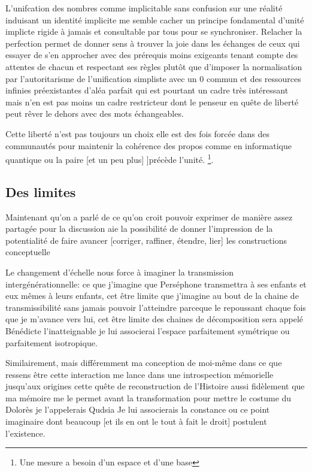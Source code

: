 \documentclass{article}
\begin{document}
L'unifcation des nombres comme implicitable sans confusion sur une réalité induisant un identité implicite me semble cacher un principe fondamental d'unité implicte rigide à jamais et consultable par tous pour se synchroniser. 
Relacher la perfection permet de donner sens à trouver la joie dans les échanges de ceux qui essayer de s'en approcher avec des prérequis moins exigeants tenant compte des attentes de chacun et respectant ses règles plutôt que d'imposer la normalisation par l'autoritarisme de l'unification simpliste avec un 0 commun et des ressources infinies préexistantes d'aléa parfait qui est pourtant un cadre très intéressant mais n'en est pas moins un cadre restricteur dont le penseur en quête de liberté peut rêver le dehors avec des mots échangeables.

Cette liberté n'est pas toujours un choix elle est des fois forcée dans des communautés pour maintenir la cohérence des propos comme en informatique quantique ou la paire [et un peu plus] ]précède l'unité. \footnote{Une mesure a besoin d'un espace et d'une base}.

\subsection{Des limites}
Maintenant qu'on a parlé de ce qu'on croit pouvoir exprimer de manière assez partagée pour la discussion aie la possibilité   de donner l'impression de la potentialité de faire avancer  [corriger, raffiner, étendre, lier] les constructions conceptuelle

Le changement d'échelle nous force à   imaginer la transmission intergénérationnelle:  ce que j'imagine que Perséphone transmettra à ses enfants 
et eux mêmes à leurs enfants, cet être limite que j'imagine au bout de la chaine de transmissibilité sans jamais pouvoir l'atteindre parceque le repoussant chaque fois que je m'avance vers lui, cet être limite des chaines de décomposition sera appelé Bénédicte l'inatteignable je lui associerai l'espace parfaitement symétrique ou parfaitement isotropique. 
   
Similairement,  mais différemment ma conception de moi-même dans ce que ressens être cette interaction me lance dans une introspection mémorielle 
jusqu'aux origines cette quête de reconstruction de l'Histoire aussi fidèlement que ma mémoire me le permet avant la transformation pour mettre le costume du Dolorès je l'appelerais Qudsia Je lui associerais la constance ou ce point imaginaire dont beaucoup [et ils en ont le tout à fait le droit] postulent l'existence.
\end{document}
